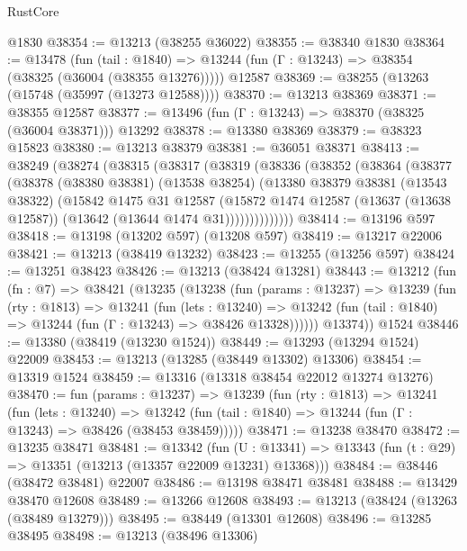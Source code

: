 \begin{lexlean}{RustCore}
\begin{coremodule}
    @1830
@38354 := @13213 (@38255 @36022)
@38355 := @38340 @1830
@38364 := @13478
    (fun (tail : @1840) => @13244 (fun (Γ : @13243) => @38354 (@38325 (@36004 (@38355 @13276)))))
    @12587
@38369 := @38255 (@13263 (@15748 (@35997 (@13273 @12588))))
@38370 := @13213 @38369
@38371 := @38355 @12587
@38377 := @13496 (fun (Γ : @13243) => @38370 (@38325 (@36004 @38371))) @13292
@38378 := @13380 @38369
@38379 := @38323 @15823
@38380 := @13213 @38379
@38381 := @36051 @38371
@38413 := @38249
    (@38274
      (@38315
        (@38317
          (@38319
            (@38336
              (@38352
                (@38364
                  (@38377
                    (@38378
                      (@38380 @38381)
                      (@13538 @38254)
                      (@13380
                        @38379
                        @38381
                        (@13543 @38322)
                        (@15842
                          @1475
                          @31
                          @12587
                          (@15872
                            @1474
                            @12587
                            (@13637 (@13638 @12587))
                            (@13642 (@13644 @1474 @31))))))))))))))
@38414 := @13196 @597
@38418 := @13198 (@13202 @597) (@13208 @597)
@38419 := @13217 @22006
@38421 := @13213 (@38419 @13232)
@38423 := @13255 (@13256 @597)
@38424 := @13251 @38423
@38426 := @13213 (@38424 @13281)
@38443 := @13212
    (fun (fn : @7) =>
    @38421
      (@13235
        (@13238
          (fun (params : @13237) =>
          @13239
            (fun (rty : @1813) =>
            @13241
              (fun (lets : @13240) =>
              @13242 (fun (tail : @1840) => @13244 (fun (Γ : @13243) => @38426 @13328))))))
        @13374))
    @1524
@38446 := @13380 (@38419 (@13230 @1524))
@38449 := @13293 (@13294 @1524) @22009
@38453 := @13213 (@13285 (@38449 @13302) @13306)
@38454 := @13319 @1524
@38459 := @13316 (@13318 @38454 @22012 @13274 @13276)
@38470 := fun (params : @13237) =>
  @13239
    (fun (rty : @1813) =>
    @13241
      (fun (lets : @13240) =>
      @13242 (fun (tail : @1840) => @13244 (fun (Γ : @13243) => @38426 (@38453 @38459)))))
@38471 := @13238 @38470
@38472 := @13235 @38471
@38481 := @13342
    (fun (U : @13341) => @13343 (fun (t : @29) => @13351 (@13213 (@13357 @22009 @13231) @13368)))
@38484 := @38446 (@38472 @38481) @22007
@38486 := @13198 @38471 @38481
@38488 := @13429 @38470 @12608
@38489 := @13266 @12608
@38493 := @13213 (@38424 (@13263 (@38489 @13279)))
@38495 := @38449 (@13301 @12608)
@38496 := @13285 @38495
@38498 := @13213 (@38496 @13306)

\end{coremodule}
\end{lexlean}
